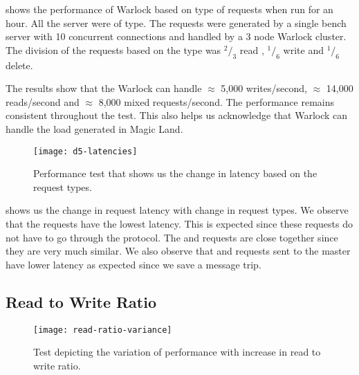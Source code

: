  shows the performance of Warlock based on
type of requests when run for an hour. All the server were of 
type. The requests were generated by a single bench server with 10 concurrent
connections and handled by a 3 node Warlock cluster. The division of the
requests based on the type was ${}^2/_3$ read , ${}^1/_6$ write and ${}^1/_6$
delete.


The results show that the Warlock can handle $\approx$ 5,000 writes/second,
$\approx$ 14,000 reads/second and $\approx$ 8,000 mixed requests/second. The
performance remains consistent throughout the test. This also helps us
acknowledge that Warlock can handle the load generated in Magic Land.

\begin{figure}
  \begin{whole}
    \texttt{[image: d5-latencies]}
    \caption[General Performance Latency Test]{%
      Performance test that shows us the change in latency based on the request
      types.
    }
    \label{figure:res.general.latency}
  \end{whole}
\end{figure}

 shows us the change in request latency%
 with change in request types. We observe that the  requests have the
lowest latency. This is expected since these requests do not have to go through
the protocol. The  and  requests are close together since
they are very much similar. We also observe that  and 
requests sent to the master have lower latency as expected since we save a
message trip.

\subsection{Read to Write Ratio}

\begin{figure}
  \begin{whole}
    \texttt{[image: read-ratio-variance]}
    \caption[Read to Write Ratio Test]{%
      Test depicting the variation of performance with increase in read
      to write ratio.
    }
    \label{figure:res.read.write.ratio}
  \end{whole}
\end{figure}

